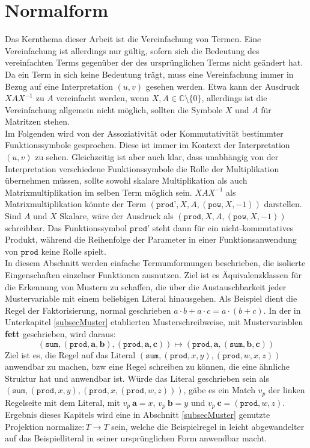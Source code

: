 



\chapter {Normalform} \label{secErsteNormalform}

Das Kernthema dieser Arbeit ist die Vereinfachung von Termen. Eine Vereinfachung ist allerdings nur gültig, sofern sich die Bedeutung des vereinfachten Terms gegenüber der des ursprünglichen Terms nicht geändert hat. Da ein Term in sich keine Bedeutung trägt, muss eine Vereinfachung immer in Bezug auf eine Interpretation $(u, v)$ gesehen werden. Etwa kann der Ausdruck $X A X^{-1}$ zu $A$ vereinfacht werden, wenn $X, A \in \mathbb{C} \setminus \{0\}$, allerdings ist die Vereinfachung allgemein nicht möglich, sollten die Symbole $X$ und $A$ für Matritzen stehen. \\
Im Folgenden wird von der Assoziativität oder Kommutativität bestimmter Funktionssymbole gesprochen. Diese ist immer im Kontext der Interpretation $(u, v)$ zu sehen. Gleichzeitig ist aber auch klar, dass unabhängig von der Interpretation verschiedene Funktionssymbole die Rolle der Multiplikation übernehmen müssen, sollte sowohl skalare Multiplikation als auch Matrixmultiplikation im selben Term möglich sein. $X A X^{-1}$ als Matrixmultiplikation könnte der Term $(\texttt{prod'}, X, A, (\texttt{pow}, X, -1))$ darstellen. Sind $A$ und $X$ Skalare, wäre der Ausdruck als $(\texttt{prod}, X, A, (\texttt{pow}, X, -1))$ schreibbar. Das Funktionssymbol $\texttt{prod'}$ steht dann für ein nicht-kommutatives Produkt, während die Reihenfolge der Parameter in einer Funktionsanwendung von $\texttt{prod}$ keine Rolle spielt.\\

In diesem Abschnitt werden einfache Termumformungen beschrieben, die isolierte Eingenschaften einzelner Funktionen ausnutzen. Ziel ist es Äquivalenzklassen für die Erkennung von Mustern zu schaffen, die über die Austauschbarkeit jeder Mustervariable mit einem beliebigen Literal hinausgehen. Als Beispiel dient die Regel der Faktorisierung, normal geschrieben $a \cdot b + a \cdot c = a \cdot (b + c)$. In der in Unterkapitel \ref{subsecMuster} etablierten Musterschreibweise, mit Mustervariablen \textbf{fett} geschrieben, wird daraus:
$$(\texttt{sum}, (\texttt{prod}, \mathbf a, \mathbf b), (\texttt{prod}, \mathbf a, \mathbf c)) \mapsto (\texttt{prod}, \mathbf a, (\texttt{sum}, \mathbf b, \mathbf c))$$
Ziel ist es, die Regel auf das Literal $(\texttt{sum}, (\texttt{prod}, x, y), (\texttt{prod}, w, x, z))$ anwendbar zu machen, bzw eine Regel schreiben zu können, die eine ähnliche Struktur hat und anwendbar ist. 
Würde das Literal geschrieben sein als $(\texttt{sum}, (\texttt{prod}, x, y), (\texttt{prod}, x, (\texttt{prod}, w, z)))$, gäbe es ein Match $v_p$ der linken Regelseite mit dem Literal, mit $v_p~\mathbf a = x$, $v_p~\mathbf b = y$ und $v_p~\mathbf c = (\texttt{prod}, w, z)$. Ergebnis dieses Kapitels wird eine in Abschnitt \ref{subsecMuster} genutzte Projektion ${\mathrm{normalize} \colon T \rightarrow T}$ sein, welche die Beispielregel in leicht abgewandelter auf das Beispielliteral in seiner ursprünglichen Form anwendbar macht.\\


